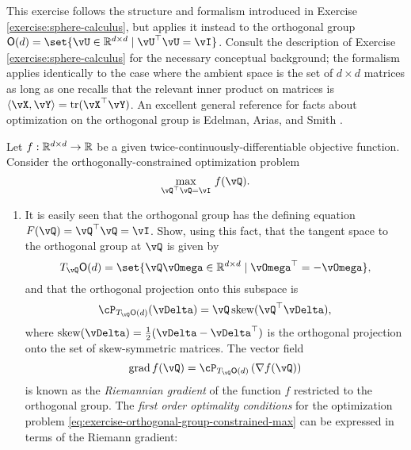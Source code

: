 \documentclass[\toplevelprefix/book-main.tex]{subfiles}
\begin{document}
\begin{exercise}\label{exercise:orthogonal-group-calculus}
    This exercise follows the structure and formalism introduced in Exercise \ref{exercise:sphere-calculus}, but applies it instead to the orthogonal group $\O(d) = \set{\vU \in \R^{d \times d} \given \vU^\top \vU = \vI}$. 
    Consult the description of Exercise \ref{exercise:sphere-calculus} for the necessary conceptual background; the formalism applies identically to the case where the ambient space is the set of $d \times d$ matrices as long as one recalls that the relevant inner product on matrices is $\ip{\vX}{\vY} = \tr(\vX^\top \vY)$.
    An excellent general reference for facts about optimization on the orthogonal group is Edelman, Arias, and Smith \cite{Edelman1998-lg}.
    
    Let $f : \mathbb{R}^{d\times d} \to \mathbb{R}$ be a given twice-continuously-differentiable objective function. Consider the orthogonally-constrained optimization problem
    \begin{equation}\label{eq:exercise-orthogonal-group-constrained-max}
        \max_{\vQ^\top \vQ = \vI}\, f(\vQ). 
    \end{equation}
    \begin{enumerate}
        \item  It is easily seen that the orthogonal group has the defining equation $F(\vQ) = \vQ^\top \vQ = \vI$.
        Show, using this fact, that the tangent space to the orthogonal group at $\vQ$ is given by
        \begin{equation*}
            T_{\vQ} \O(d) = \set{\vQ \vOmega \in \R^{d\times d} \given \vOmega^\top = - \vOmega},
        \end{equation*}
        and that the orthogonal projection onto this subspace is 
        \begin{equation*}
        \cP_{T_{\vQ}\O(d)}(\vDelta) =  \vQ \Skew(\vQ^\top \vDelta),
        \end{equation*}
        where $\Skew(\vDelta) = \tfrac{1}{2} ( \vDelta - \vDelta^\top)$ is the orthogonal projection onto the set of skew-symmetric matrices.
        The vector field 
        \begin{equation}\label{eq:exercise-riemann-grad-orthogonal-group}
        \mathrm{grad}\, f(\vQ) = \cP_{T_{\vQ} \O(d)} \left( \nabla f(\vQ) \right)
        \end{equation}
        is known as the \textit{Riemannian gradient} of the function $f$ restricted to the orthogonal group.
        The \textit{first order optimality conditions} for the optimization problem \eqref{eq:exercise-orthogonal-group-constrained-max} can be expressed in terms of the Riemann gradient:

\end{enumerate}
\end{exercise}
\end{document}
